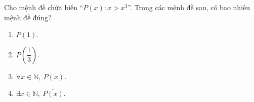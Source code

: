 \begin{ex}
Cho mệnh đề chứa biến ``$P(x)\colon x>x^3$''. Trong các mệnh đề sau, có bao nhiêu mệnh đề đúng?
\begin{enumerate}[label=\alph*)]
\item $P(1)$.
\item $P\left(\dfrac13\right)$.
\item $\forall x\in\mathbb N,\ P(x)$.
\item $\exists x\in\mathbb N,\ \overline{P(x)}$.
\end{enumerate}
\end{ex}
